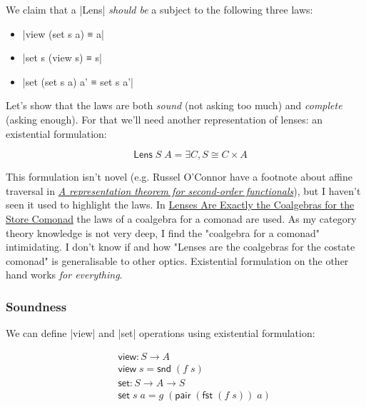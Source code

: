 \documentclass{article}
\begin{document}
We claim that a |Lens| \emph{should be} a subject to the following three laws:

\begin{itemize}
\item |view (set s a) ≡ a|
\item |set s (view s) ≡ s|
\item |set (set s a) a' ≡ set s a'|
\end{itemize}

Let's show that the laws are both \emph{sound} (not asking too much)
and \emph{complete} (asking enough). For that we'll need another representation
of lenses: an existential formulation:

\begin{equation}
\quad \mathsf{Lens}\;S\;A = \exists C, S \cong C \times A
\end{equation}

This formulation isn't novel (e.g. Russel O'Connor have a footnote about affine traversal in
\href{https://www.cambridge.org/core/journals/journal-of-functional-programming/article/representation-theorem-for-secondorder-functionals/4B782B0BB6EB53E53935D7A0F8432E8E}{\emph{A representation theorem for second-order functionals}}),
but I haven't seen it used to highlight the laws.
In \href{https://r6research.livejournal.com/23705.html}{Lenses Are Exactly the Coalgebras for the Store Comonad}
the laws of a coalgebra for a comonad are used.
As my category theory knowledge is not very deep, I find the "coalgebra for a comonad" intimidating.
I don't know if and how "Lenses are the coalgebras for the costate comonad" is generalisable to other optics.
Existential formulation on the other hand works \emph{for everything}.

\subsubsection{Soundness}

We can define |view| and |set| operations using existential formulation:

\begin{equation}
\begin{aligned}
\quad &\mathsf{view} : S \to A \\
      &\mathsf{view}\;s   = \mathsf{snd}\; (f\;s) \\
      &\mathsf{set} : S \to A \to S \\
      &\mathsf{set}\;s\;a = g\; (\mathsf{pair}\;(\mathsf{fst}\;(f\;s))\;a)
\end{aligned}
\end{equation}
\end{document}
